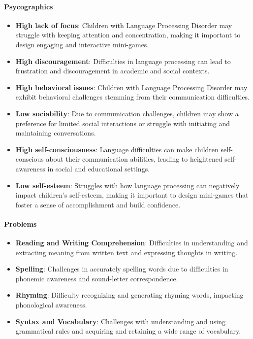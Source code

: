 \paragraph{Psycographics}
\begin{itemize}
    \item \textbf{High lack of focus}: Children with Language Processing Disorder may struggle with keeping attention and concentration, making it important to design engaging and interactive mini-games.
    \item \textbf{High discouragement}: Difficulties in language processing can lead to frustration and discouragement in academic and social contexts.
    \item \textbf{High behavioral issues}: Children with Language Processing Disorder may exhibit behavioral challenges stemming from their communication difficulties.
    \item \textbf{Low sociability}: Due to communication challenges, children may show a preference for limited social interactions or struggle with initiating and maintaining conversations.
    \item \textbf{High self-consciousness}: Language difficulties can make children self-conscious about their communication abilities, leading to heightened self-awareness in social and educational settings.
    \item \textbf{Low self-esteem}: Struggles with how language processing can negatively impact children's self-esteem, making it important to design mini-games that foster a sense of accomplishment and build confidence.
\end{itemize}

\paragraph{Problems}
\begin{itemize}
    \item \textbf{Reading and Writing Comprehension}: Difficulties in understanding and extracting meaning from written text and expressing thoughts in writing.
    \item \textbf{Spelling}: Challenges in accurately spelling words due to difficulties in phonemic awareness and sound-letter correspondence.
    \item \textbf{Rhyming}: Difficulty recognizing and generating rhyming words, impacting phonological awareness.
    \item \textbf{Syntax and Vocabulary}: Challenges with understanding and using grammatical rules and acquiring and retaining a wide range of vocabulary.
\end{itemize}

